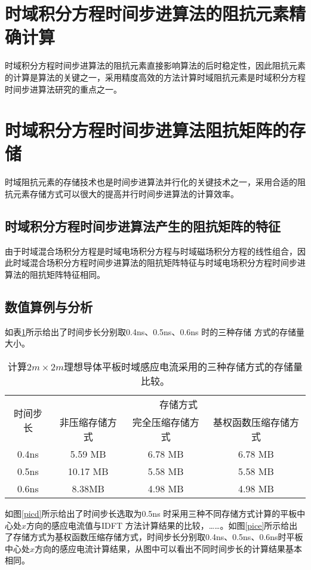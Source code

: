 \documentclass[master]{thesis-uestc}
\begin{document}
\section{时域积分方程时间步进算法的阻抗元素精确计算}
时域积分方程时间步进算法的阻抗元素直接影响算法的后时稳定性，因此阻抗元素的计算是算法的关键之一，采用精度高效的方法计算时域阻抗元素是时域积分方程时间步进算法研究的重点之一。

\section{时域积分方程时间步进算法阻抗矩阵的存储}
时域阻抗元素的存储技术也是时间步进算法并行化的关键技术之一，采用合适的阻抗元素存储方式可以很大的提高并行时间步进算法的计算效率。

\subsection{时域积分方程时间步进算法产生的阻抗矩阵的特征}
由于时域混合场积分方程是时域电场积分方程与时域磁场积分方程的线性组合，因此时域混合场积分方程时间步进算法的阻抗矩阵特征与时域电场积分方程时间步进算法的阻抗矩阵特征相同。

\subsection{数值算例与分析}
如表\ref{tablea}所示给出了时间步长分别取0.4ns、0.5ns、0.6ns 时的三种存储
方式的存储量大小。

\begin{table}[h]
\caption{计算$2m\times 2m$理想导体平板时域感应电流采用的三种存储方式的存储量比较。}
\begin{tabular}{cccc}
\toprule
\multirow{2}{*}{时间步长} & \multicolumn{3}{c}{存储方式} \\
\cmidrule{2-4}
& 非压缩存储方式 & 完全压缩存储方式 & 基权函数压缩存储方式 \\
\midrule
0.4ns & 5.59 MB & 6.78 MB & 6.78 MB\\
0.5ns & 10.17 MB & 5.58 MB & 5.58 MB \\
0.6ns & 8.38MB & 4.98 MB & 4.98 MB \\
\bottomrule
\end{tabular}
\label{tablea}
\end{table}

如图\ref{picd}所示给出了时间步长选取为0.5ns 时采用三种不同存储方式计算的平板中心处$x$方向的感应电流值与IDFT 方法计算结果的比较，……。如图\ref{pice}所示给出了存储方式为基权函数压缩存储方式，时间步长分别取0.4ns、0.5ns、0.6ns时平板中心处$x$方向的感应电流计算结果，从图中可以看出不同时间步长的计算结果基本相同。
\end{document}
